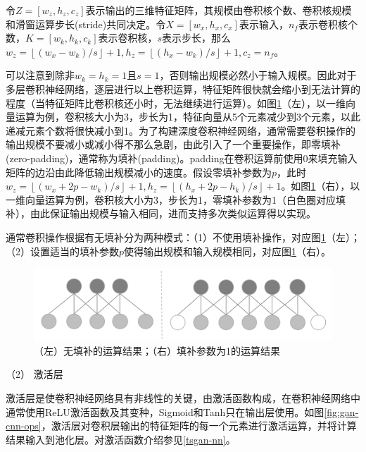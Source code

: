 令$Z=[w_{z}, h_{z}, c_{z}]$表示输出的三维特征矩阵，其规模由卷积核个数、卷积核规模和滑窗运算步长(stride)共同决定。令$X=[w_{x}, h_{x}, c_{x}]$表示输入，$n_{f}$表示卷积核个数，$K=[w_{k},h_{k},c_{k}]$表示卷积核，$s$表示步长，那么$w_{z} = \left \lfloor (w_{x} - w_{k})/s \right \rfloor + 1, h_{z} = \left \lfloor (h_{x} - w_{k})/s \right \rfloor + 1, c_{z} = n_{f}$。

可以注意到除非$w_{k}=h_{k}=1$且$s=1$，否则输出规模必然小于输入规模。因此对于多层卷积神经网络，逐层进行以上卷积运算，特征矩阵很快就会缩小到无法计算的程度（当特征矩阵比卷积核还小时，无法继续进行运算）。如图\ref{fig:gan-cnn-padding}（左），以一维向量运算为例，卷积核大小为3，步长为1，特征向量从5个元素减少到3个元素，以此递减元素个数将很快减小到1。为了构建深度卷积神经网络，通常需要卷积操作的输出规模不要减小或减小得不那么急剧，由此引入了一个重要操作，即零填补(zero-padding)，通常称为填补(padding)。padding在卷积运算前使用0来填充输入矩阵的边沿由此降低输出规模减小的速度。假设零填补参数为$p$，此时 $w_{z} = \left \lfloor (w_{x}+2p-w_{k})/s \right \rfloor + 1, h_{z} = \left \lfloor (h_{x}+2p-h_{k})/s \right \rfloor+1$。如图\ref{fig:gan-cnn-padding}（右），以一维向量运算为例，卷积核大小为3，步长为1，零填补参数为1（白色圈对应填补），由此保证输出规模与输入相同，进而支持多次类似运算得以实现。

通常卷积操作根据有无填补分为两种模式：（1）不使用填补操作，对应图\ref{fig:gan-cnn-padding}（左）；（2）设置适当的填补参数$p$使得输出规模和输入规模相同，对应图\ref{fig:gan-cnn-padding}（右）。

\begin{figure}[H]
\centering
\includegraphics[scale=0.5]{figures/gan-cnn-padding.png}
\caption{（左）无填补的运算结果；（右）填补参数为1的运算结果}
\label{fig:gan-cnn-padding}
\end{figure}

（2） 激活层

激活层是使卷积神经网络具有非线性的关键，由激活函数构成，在卷积神经网络中通常使用ReLU激活函数及其变种，Sigmoid和Tanh只在输出层使用。如图\ref{fig:gan-cnn-ops}，激活层对卷积层输出的特征矩阵的每一个元素进行激活运算，并将计算结果输入到池化层。对激活函数介绍参见\ref{tsgan-nn}。

